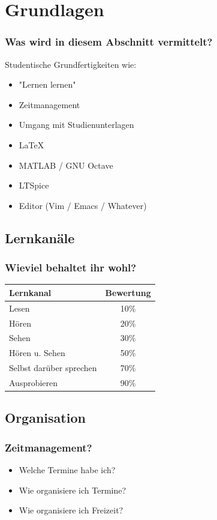 \documentclass[german,ignorenonframetext]{beamer} %
\begin{document}
\section{Grundlagen}
\begin{frame}
\frametitle{Was wird in diesem Abschnitt vermittelt?}

Studentische Grundfertigkeiten wie:
\begin{itemize}
\item "Lernen lernen"
\item Zeitmanagement
\item Umgang mit Studienunterlagen
\item \LaTeX
\item MATLAB / GNU Octave
\item LTSpice
\item Editor (Vim / Emacs / Whatever)
\end{itemize}
\end{frame}

\subsection{Lernkanäle}
\begin{frame}
\frametitle{Wieviel behaltet ihr wohl?}
\begin{center}
\begin{tabular}{ | l | c | }
\hline
\textbf{Lernkanal} & \textbf{Bewertung} \\ \hline
Lesen & 10\% \\ \hline
Hören & 20\% \\ \hline
Sehen & 30\% \\ \hline
Hören u. Sehen & 50\% \\ \hline
Selbst darüber sprechen & 70\% \\ \hline
Ausprobieren & 90\% \\ \hline
\end{tabular}
\end{center}
\end{frame}

\subsection{Organisation}
\begin{frame}
\frametitle{Zeitmanagement?}
\begin{itemize}
\item Welche Termine habe ich?
\pause
\item Wie organisiere ich Termine?
\pause
\item Wie organisiere ich Freizeit?
\end{itemize}
\end{frame}
\end{document}
